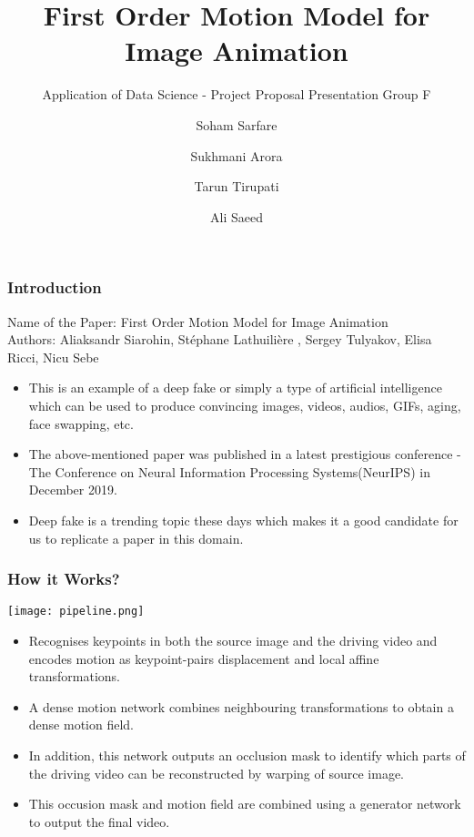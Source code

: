 \documentclass[11pt]{beamer}
\begin{document}
	\author[Soham, Sukhmani, Tarun, Ali]{Soham Sarfare \and Sukhmani Arora \and Tarun Tirupati \and Ali Saeed}
	\title[First Order Model]{First Order Motion Model for Image Animation}
	\subtitle{Application of Data Science - Project Proposal Presentation Group F}
	\begin{frame}[plain]
		\maketitle
	\end{frame}
	\begin{frame}
		\frametitle{Introduction}
		Name of the Paper: First Order Motion Model for Image Animation\\
		Authors: Aliaksandr Siarohin, Stéphane Lathuilière , Sergey Tulyakov, Elisa Ricci, Nicu Sebe
		\begin{itemize}
			\item This is an example of a deep fake or simply a type of artificial intelligence which can be used to produce convincing images, videos, audios, GIFs, aging, face swapping, etc.
			\item The above-mentioned paper was published in a latest prestigious conference - The Conference on Neural Information Processing Systems(NeurIPS) in December 2019.
			\item Deep fake is a trending topic these days which makes it a good candidate for us to replicate a paper in this domain.
		\end{itemize}
	\end{frame}
\begin{frame}
\frametitle{How it Works?}
\begin{centering}
\texttt{[image: pipeline.png]}\\
\end{centering}

\begin{itemize}
\item Recognises keypoints in both the source image and the driving video and encodes motion as keypoint-pairs displacement and local affine transformations.
\item A dense motion network combines neighbouring transformations to obtain a dense motion field. 
\item In addition, this network outputs an occlusion mask to identify which parts of the driving video can be reconstructed by warping of source image.
\item This occusion mask and motion field are combined using a generator network to output the final video.
\end{itemize}
\end{frame}
\end{document}
